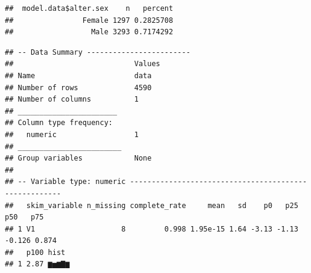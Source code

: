 \documentclass[
]{book}
\newenvironment{Shaded}{\begin{snugshade}}{\end{snugshade}}
\newcommand{\CommentTok}[1]{\textcolor[rgb]{0.56,0.35,0.01}{\textit{#1}}}
\newcommand{\DocumentationTok}[1]{\textcolor[rgb]{0.56,0.35,0.01}{\textbf{\textit{#1}}}}
\newcommand{\FunctionTok}[1]{\textcolor[rgb]{0.13,0.29,0.53}{\textbf{#1}}}
\newcommand{\NormalTok}[1]{#1}
\newcommand{\SpecialCharTok}[1]{\textcolor[rgb]{0.81,0.36,0.00}{\textbf{#1}}}
\begin{document}
\begin{Shaded}
\end{Shaded}

\begin{verbatim}
##  model.data$alter.sex    n   percent
##                Female 1297 0.2825708
##                  Male 3293 0.7174292
\end{verbatim}

\begin{Shaded}
\end{Shaded}

\begin{verbatim}
## -- Data Summary ------------------------
##                            Values
## Name                       data  
## Number of rows             4590  
## Number of columns          1     
## _______________________          
## Column type frequency:           
##   numeric                  1     
## ________________________         
## Group variables            None  
## 
## -- Variable type: numeric ------------------------------------------------------
##   skim_variable n_missing complete_rate     mean   sd    p0   p25    p50   p75
## 1 V1                    8         0.998 1.95e-15 1.64 -3.13 -1.13 -0.126 0.874
##   p100 hist 
## 1 2.87 ▆▅▆▇▆
\end{verbatim}
\end{document}
